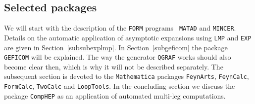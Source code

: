 \subsection{\label{subselpac}Selected packages}
%
We will start with the description of the {\tt FORM} programs {\tt
  MATAD} and {\tt MINCER}.  Details on the automatic application of
asymptotic expansions using {\tt LMP} and {\tt EXP} are given in
Section~\ref{subsubexplmp}.  In Section~\ref{subgeficom} the package
{\tt GEFICOM} will be explained. The way the generator {\tt QGRAF} works
should also become clear then, which is why it will not be described
separately.  The subsequent section is devoted to the {\tt Mathematica}
packages {\tt FeynArts}, {\tt FeynCalc}, {\tt FormCalc}, {\tt TwoCalc}
and {\tt LoopTools}.  In the concluding section we discuss the package
{\tt CompHEP} as an application of automated multi-leg computations.


